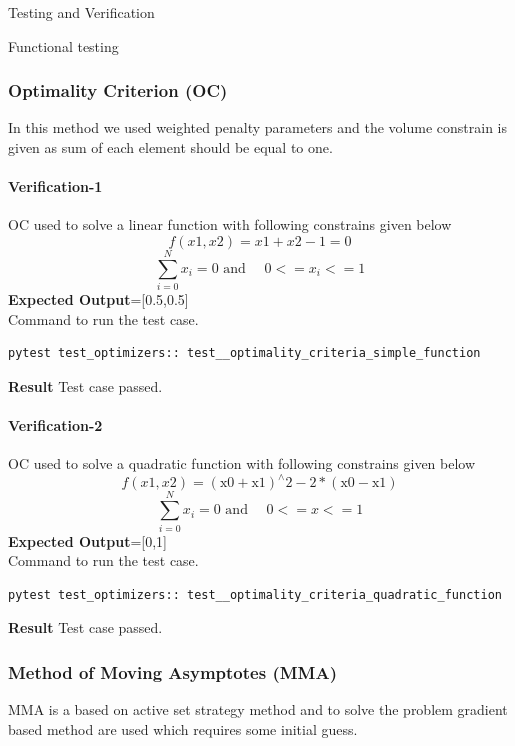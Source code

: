 \documentclass[a4paper,12pt,times]{article}
\begin{document}
\begin{section}{Testing and Verification}
\begin{subsection}{Functional testing}
\subsubsection{Optimality Criterion (OC)}
In this method we used weighted penalty parameters and the volume constrain is given as sum of each element should be equal to one.
\paragraph{Verification-1}
OC used to solve a linear function with following constrains given below 
\begin{equation}
f(x 1, x 2)=x 1+x 2-1=0
\end{equation}
\begin{equation}
\sum_{i=0}^{N} x_{i}=0 
\text { and } \quad 0<=x_{i}<=1
\end{equation}
\textbf{Expected Output}=[0.5,0.5]\\
Command to run the test case.
\begin{lstlisting}
pytest test_optimizers:: test__optimality_criteria_simple_function
\end{lstlisting}
\textbf{Result} Test case passed.



\paragraph{Verification-2}
OC used to solve a quadratic function with following constrains given below 
\begin{equation}
f(x 1, x 2)=(\mathrm{x} 0+\mathrm{x} 1)^{\wedge} 2-2*(\mathrm{x} 0-\mathrm{x} 1)
\end{equation}
\begin{equation}
\sum_{i=0}^{N} x_{i}=0 
\text { and } \quad 0<=x<=1
\end{equation}
\textbf{Expected Output}=[0,1]\\
Command to run the test case.
\begin{lstlisting}
pytest test_optimizers:: test__optimality_criteria_quadratic_function
\end{lstlisting}
\textbf{Result} Test case passed.
\subsubsection{Method of Moving Asymptotes (MMA)}
MMA is a based on active set strategy method and to solve the problem gradient based method are used which requires some initial guess.


\end{subsection}
\end{section}
\end{document}
